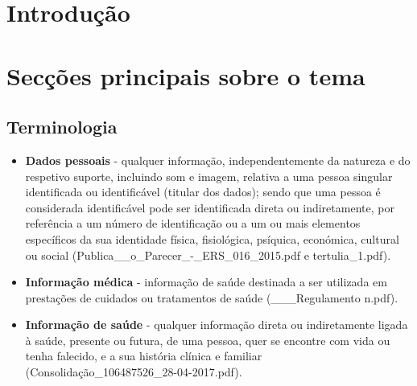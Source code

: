 \documentclass{article}
\begin{document}
\begin{multicols}{2}


\section{Introdução}


\section{Secções principais sobre o tema}


\subsection{Terminologia}

\begin{itemize}

	\item \textbf{Dados pessoais} - qualquer informação, independentemente da natureza e do respetivo suporte, incluindo som e imagem, relativa a uma pessoa singular identificada ou identificável (titular dos dados); sendo que uma pessoa é considerada identificável pode ser identificada direta ou indiretamente, por referência a um número de identificação ou a um ou mais elementos específicos da sua identidade física, fisiológica, psíquica, económica, cultural ou social (Publica__o_Parecer_-_ERS_016_2015.pdf e tertulia_1.pdf).
	
	\item \textbf{Informação médica} - informação de saúde destinada a ser utilizada em prestações de cuidados ou tratamentos de saúde (___Regulamento n.pdf).
	
	\item \textbf{Informação de saúde} - qualquer informação direta ou indiretamente ligada à saúde, presente ou futura, de uma pessoa, quer se encontre com vida ou tenha falecido, e a sua história clínica e familiar (Consolidação_106487526_28-04-2017.pdf).
	

\end{itemize}
\end{multicols}
\end{document}
